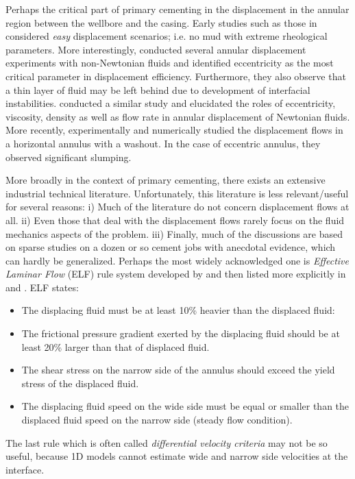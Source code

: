 \documentclass[review]{elsarticle}
\begin{document}
Perhaps the critical part of primary cementing in the displacement in the annular region between the wellbore and the casing. Early studies such as those in \cite{Mclean1967,lockyear1989} considered \emph{easy} displacement scenarios; i.e. no mud with extreme rheological parameters. More interestingly, \cite{tehrani1993} conducted several annular displacement experiments with non-Newtonian fluids and identified eccentricity as the most critical parameter in displacement efficiency. Furthermore, they also observe that a thin layer of fluid may be left behind due to development of interfacial instabilities.  \cite{malekmohammadi2010} conducted a similar study and elucidated the roles of eccentricity, viscosity, density as well as flow rate in annular displacement of Newtonian fluids. More recently, \cite{Renteria2018} experimentally and numerically studied the displacement flows in a horizontal annulus with a washout. In the case of eccentric annulus, they observed significant slumping.  

More broadly in the context of primary cementing, there exists an extensive industrial technical literature. Unfortunately, this literature is less relevant/useful for several reasons: i) Much of the literature do not concern displacement flows at all. ii) Even those that deal with the displacement flows rarely focus on the fluid mechanics aspects of the problem. iii) Finally, much of the discussions are based on sparse studies on a dozen or so cement jobs with anecdotal evidence, which can hardly be generalized. Perhaps the most widely acknowledged one is \emph{Effective Laminar Flow} (ELF) rule system developed by \citet{Couturier1990} and then listed more explicitly in \citet{brady1992} and \citet{theron2002}. ELF states:	  
\begin{itemize}
		\item The displacing fluid must be at least 10\% heavier than the displaced fluid:
		\item The frictional pressure gradient exerted by the displacing fluid should be at least 20\% larger than that of displaced fluid. 
		\item The shear stress on the narrow side of the annulus should exceed the yield stress of the displaced fluid. 
		\item The displacing fluid speed on the wide side must be equal or smaller than the displaced fluid speed on the narrow side (steady flow condition).	
\end{itemize}
The last rule which is often called \emph{differential velocity criteria} may not be so useful, because 1D models cannot estimate wide and narrow side velocities at the interface.
\end{document}

